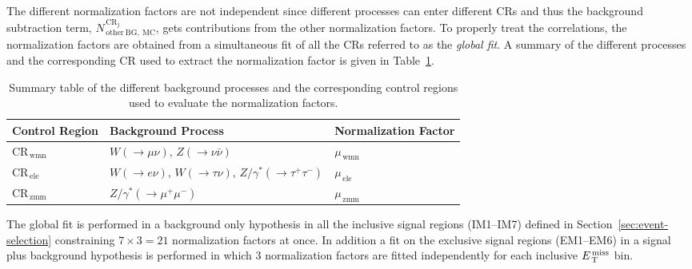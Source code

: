 The different normalization factors are not independent since different
processes can enter different CRs and thus the background subtraction term,
$N_\mathrm{\, other~BG,~MC}^{\mathrm{\, CR}_j}$, gets contributions from the
other normalization factors. To properly treat the correlations, the
normalization factors are obtained from a simultaneous fit of all the CRs
referred to as the \emph{global fit}. A summary of the different processes and
the corresponding CR used to extract the normalization factor is given in
Table~\ref{tab:norm_factors}.
\begin{table}[!th]
  \centering
  \begin{tabular}{lll}
    \toprule
    Control Region & Background Process & Normalization Factor \\
    \midrule \midrule
    CR$_\mathrm{\, wmn}$ & $W (\rightarrow \mu \nu),\, Z (\rightarrow \nu \bar{\nu})$ & $\mu_\mathrm{\, wmn}$ \\
    CR$_\mathrm{\, ele}$ & $W (\rightarrow e \nu),\, W (\rightarrow \tau \nu),\,
                           Z/\gamma^* (\rightarrow \tau^+ \tau^-)$ & $\mu_\mathrm{\, ele}$ \\
    CR$_\mathrm{\, zmm}$ & $Z/\gamma^* (\rightarrow \mu^+ \mu^-)$ & $\mu_\mathrm{\, zmm}$ \\
    \bottomrule
  \end{tabular}
  \caption{Summary table of the different background processes and the
    corresponding control regions used to evaluate the normalization factors.}
  \label{tab:norm_factors}
\end{table}

The global fit is performed in a background only hypothesis in all the inclusive
signal regions (IM1--IM7) defined in Section~\ref{sec:event-selection}
constraining $7 \times 3 = 21$ normalization factors at once. In addition a fit
on the exclusive signal regions (EM1--EM6) in a signal plus background
hypothesis is performed in which 3 normalization factors are fitted
independently for each inclusive $E_\mathrm{\, T}^\mathrm{\, miss}$ bin.

